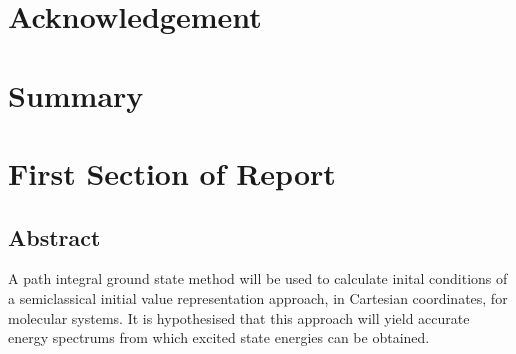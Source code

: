 \documentclass[12pt,letterpaper, oneside, draft]{article}              %
\numberwithin{equation}{section} %
\begin{document}
 

\doublespacing
\newpage

\section*{Acknowledgement}
\newpage

\section*{Summary}
\newpage

\tableofcontents
\newpage

\listoffigures
\newpage

\listoftables
\newpage

\section{First Section of Report}
\newpage


\subsection*{Abstract}
A path integral ground state method will be used to calculate inital conditions of a semiclassical initial value representation approach, in Cartesian coordinates, 
for molecular systems. It is hypothesised that this approach will yield accurate energy spectrums from which excited state energies can be obtained. 
\end{document}
